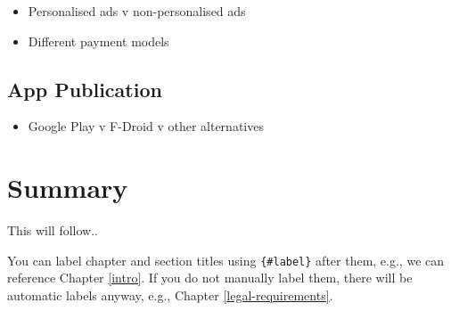 \documentclass[
]{book}
\providecommand{\tightlist}{%
  \setlength{\itemsep}{0pt}\setlength{\parskip}{0pt}}
\begin{document}
\begin{itemize}
\tightlist
\item
  Personalised ads v non-personalised ads
\item
  Different payment models
\end{itemize}

\hypertarget{app-publication}{%
\section{App Publication}\label{app-publication}}

\begin{itemize}
\tightlist
\item
  Google Play v F-Droid v other alternatives
\end{itemize}

\hypertarget{summary}{%
\chapter{Summary}\label{summary}}

This will follow..

You can label chapter and section titles using \texttt{\{\#label\}} after them, e.g., we can reference Chapter \ref{intro}. If you do not manually label them, there will be automatic labels anyway, e.g., Chapter \ref{legal-requirements}.

  
\end{document}
